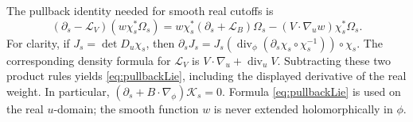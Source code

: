 \documentclass[11pt]{article}
\numberwithin{equation}{section}
\theoremstyle{definition}
\newcommand{\Li}{\mathcal L}
\begin{document}
The pullback identity needed for smooth real cutoffs is
\begin{equation}
 (\partial_s-\Li_V)(w\chi_s^*\Omega_s)
  =w\chi_s^*(\partial_s+\Li_B)\Omega_s
       -(V\cdot\nabla_u w)\chi_s^*\Omega_s.
 \label{eq:pullbackLie}
\end{equation}
For clarity, if \(J_s=\det D_u\chi_s\), then
\(\partial_sJ_s=J_s(\operatorname{div}_\phi
(\partial_s\chi_s\circ\chi_s^{-1}))\circ\chi_s\).
The corresponding density formula for \(\mathcal L_V\) is
\(V\cdot\nabla_u+\operatorname{div}_uV\).
Subtracting these two product rules yields \eqref{eq:pullbackLie},
including the displayed derivative of the real weight. In particular,
\((\partial_s+B\cdot\nabla_\phi)\mathcal K_s=0\).
Formula \eqref{eq:pullbackLie} is used on the real \(u\)-domain;
the smooth function \(w\) is never extended holomorphically in \(\phi\).
\end{document}
